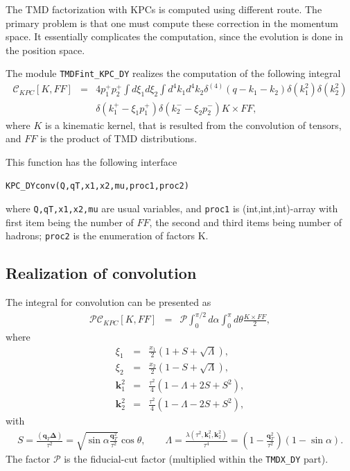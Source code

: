 \documentclass[prd,nofootinbib,eqsecnum,final]{revtex4}
\renewcommand{\(}{\left(}
\renewcommand{\)}{\right)}
\renewcommand{\[}{\left[}
\renewcommand{\]}{\right]}
\renewcommand{\vec}[1]{\bm{#1}}
\begin{document}
The TMD factorization with KPCs is computed using different route. The primary problem is that one must compute these correction in the momentum space. It essentially complicates the computation, since the evolution is done in the position space. 

The module \texttt{TMDFint\_KPC\_DY} realizes the computation of the following integral
\begin{eqnarray}\label{KPC:main}
\mathcal{C}_{KPC}[K,FF]&=&4p_1^+p_2^+\int d\xi_1 d\xi_2 \int d^4k_1 d^4k_2 \delta^{(4)}(q-k_1-k_2)\delta(k_1^2)\delta(k_2^2)
\\ &&\delta(k_1^+-\xi_1 p_1^+)\delta(k_2^--\xi_2 p_2^-)K \times FF,
\end{eqnarray}
where $K$ is a kinematic kernel, that is resulted from the convolution of tensors, and $FF$ is the product of TMD distributions.

This function has the following interface
\begin{center}
\texttt{KPC\_DYconv(Q,qT,x1,x2,mu,proc1,proc2)}
\end{center}
where \texttt{Q,qT,x1,x2,mu} are usual variables, and \texttt{proc1} is (int,int,int)-array with first item being the number of $FF$, the second and third items being number of hadrons; \texttt{proc2} is the enumeration of factors K.

\subsection{Realization of convolution}

The integral for convolution can be presented as
\begin{eqnarray}
\mathcal{P} \mathcal{C}_{KPC}[K,FF]&=&\mathcal{P}
\int_{0}^{\pi/2}d\alpha \int_0^{\pi}d\theta  \frac{K \times FF }{2},
\end{eqnarray}
where 
\begin{eqnarray}
\xi_1&=&\frac{x_1}{2}\(1+S+\sqrt{\Lambda}\),
\\
\xi_2&=&\frac{x_2}{2}\(1-S+\sqrt{\Lambda}\),
\\
\vec k_1^2&=&\frac{\tau^2}{4}\(1-\Lambda+2S+S^2\),
\\
\vec k_2^2&=&\frac{\tau^2}{4}\(1-\Lambda-2S+S^2\),
\end{eqnarray}
with
\begin{eqnarray}
S=\frac{(\vec q_T\vec \Delta)}{\tau^2}=\sqrt{\sin \alpha \frac{\vec q_T^2}{\tau^2}}\cos\theta,\qquad \Lambda=\frac{\lambda(\tau^2,\vec k_1^2,\vec k_2^2)}{\tau^4}=\(1-\frac{\vec q_T^2}{\tau^2}\)\(1-\sin\alpha\).
\end{eqnarray}
The factor $\mathcal{P}$ is the fiducial-cut factor (multiplied within the \texttt{TMDX\_DY} part).
\end{document}
